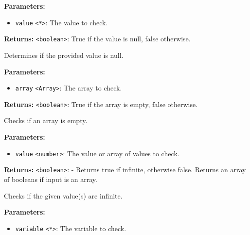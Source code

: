 \documentclass[12pt,a4paper]{article}
\begin{document}
\noindent \textbf{Parameters:}
\begin{itemize}
  \item \texttt{value} \texttt{<*>}: The value to check.
\end{itemize}

\noindent \textbf{Returns:} \texttt{<boolean>}: True if the value is null, false otherwise.

\noindent Determines if the provided value is null.

\vspace{5mm}
\noindent {}


\noindent \textbf{Parameters:}
\begin{itemize}
  \item \texttt{array} \texttt{<Array>}: The array to check.
\end{itemize}

\noindent \textbf{Returns:} \texttt{<boolean>}: True if the array is empty, false otherwise.

\noindent Checks if an array is empty.

\vspace{5mm}
\noindent {}


\noindent \textbf{Parameters:}
\begin{itemize}
  \item \texttt{value} \texttt{<number>}: The value or array of values to check.
\end{itemize}

\noindent \textbf{Returns:} \texttt{<boolean>}: - Returns true if infinite, otherwise false. Returns an array of booleans if input is an array.

\noindent Checks if the given value(s) are infinite.

\vspace{5mm}
\noindent {}


\noindent \textbf{Parameters:}
\begin{itemize}
  \item \texttt{variable} \texttt{<*>}: The variable to check.
\end{itemize}
\end{document}
